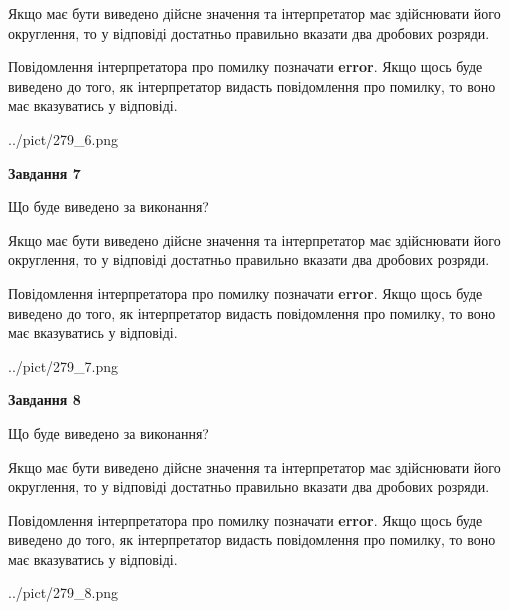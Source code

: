 \documentclass[12pt, ukrainian]{article}
\begin{document}
{\begin {Large}
Якщо має бути виведено дійсне значення та інтерпретатор має здійснювати його округлення, 
то у відповіді достатньо правильно вказати два дробових розряди.

Повідомлення інтерпретатора про помилку позначати \textbf{error}.
Якщо щось буде виведено до того, як інтерпретатор видасть повідомлення про помилку, 
то воно має вказуватись у відповіді. \par

\begin{center}
	{../pict/279_6.png}
\end{center}
\newpage

{\begin {center}\textbf{Завдання 7}\end {center}}\par
Що буде виведено за виконання? \par

Якщо має бути виведено дійсне значення та інтерпретатор має здійснювати його округлення, 
то у відповіді достатньо правильно вказати два дробових розряди.

Повідомлення інтерпретатора про помилку позначати \textbf{error}.
Якщо щось буде виведено до того, як інтерпретатор видасть повідомлення про помилку, 
то воно має вказуватись у відповіді. \par

\begin{center}
	{../pict/279_7.png}
\end{center}
\newpage

{\begin {center}\textbf{Завдання 8}\end {center}}\par
Що буде виведено за виконання? \par

Якщо має бути виведено дійсне значення та інтерпретатор має здійснювати його округлення, 
то у відповіді достатньо правильно вказати два дробових розряди.

Повідомлення інтерпретатора про помилку позначати \textbf{error}.
Якщо щось буде виведено до того, як інтерпретатор видасть повідомлення про помилку, 
то воно має вказуватись у відповіді. \par

\begin{center}
	{../pict/279_8.png}
\end{center}
\newpage


\end{Large}}
\end{document}

